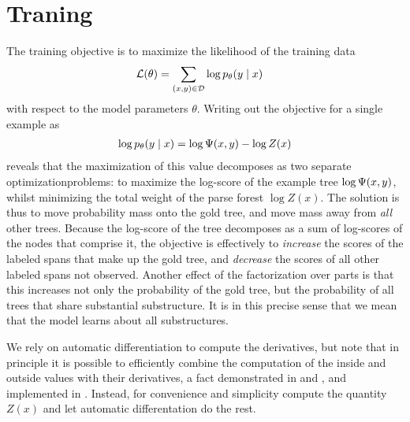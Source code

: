 \section{Traning}
The training objective is to maximize the likelihood of the training data
\begin{align*}
  \mathcal{L}(\theta)
    &= \sum_{(x, y) \in \mathcal{D}} \log p_{\theta}(y \mid x)
\end{align*}
with respect to the model parameters $\theta$. Writing out the objective for a single example as
\begin{align*}
  \log p_{\theta}(y \mid x) = \log \Psi(x, y) - \log Z(x)
\end{align*}
reveals that the maximization of this value decomposes as two separate optimizationproblems: to maximize the log-score of the example tree $\log \Psi(x, y)$, whilst minimizing the total weight of the parse forest $\log Z(x)$. The solution is thus to move probability mass onto the gold tree, and move mass away from \textit{all} other trees. Because the log-score of the tree decomposes as a sum of log-scores of the nodes that comprise it, the objective is effectively to \textit{increase} the scores of the labeled spans that make up the gold tree, and \textit{decrease} the scores of all other labeled spans not observed. Another effect of the factorization over parts is that this increases not only the probability of the gold tree, but the probability of all trees that share substantial substructure. It is in this precise sense that we mean that the model learns about all substructures.

We rely on automatic differentiation to compute the derivatives, but note that in principle it is possible to efficiently combine the computation of the inside and outside values with their derivatives, a fact demonstrated in \citep{eisner2009semirings} and \citep{eisner2016backprop}, and implemented in \citep{kim2017structured}. Instead, for convenience and simplicity compute the quantity $Z(x)$ and let automatic differentation do the rest.

